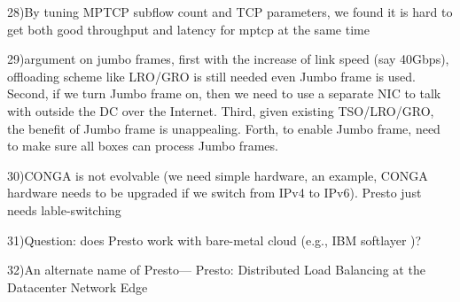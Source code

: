 28)By tuning MPTCP subflow count and TCP parameters, we found it is hard to get both good throughput and latency for mptcp at the same time

29)argument on jumbo frames, first with the increase of link speed (say 40Gbps), offloading scheme like LRO/GRO is still needed even Jumbo frame is used. Second, 
if we turn Jumbo frame on, then we need to use a separate NIC to talk with outside the DC over the Internet. 
Third, given existing TSO/LRO/GRO, the benefit of Jumbo frame is unappealing. Forth, to enable Jumbo frame, need to make sure all boxes can process Jumbo frames.

30)CONGA is not evolvable (we need simple hardware, an example, CONGA hardware needs to be upgraded if we switch from IPv4 to IPv6). Presto just needs lable-switching

31)Question: does Presto work with bare-metal cloud (e.g., IBM softlayer )?

32)An alternate name of Presto--- Presto: Distributed Load Balancing at the Datacenter Network Edge
